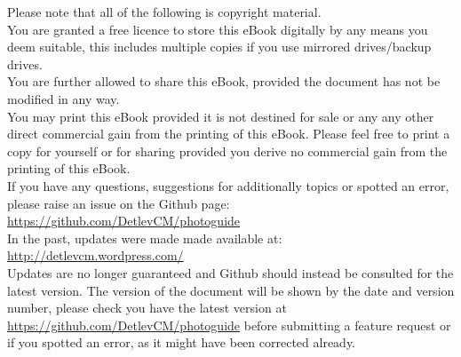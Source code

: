 \begin{center}
Please note that all of the following is copyright material.
\\
\vspace{10 mm}
You are granted a free licence to store this eBook digitally by any means you deem suitable, this includes multiple copies if you use mirrored drives/backup drives.
\\
You are further allowed to share this eBook, provided the document has not be modified in any way. 
\\
\vspace{5 mm}
You may print this eBook provided it is not destined for sale or any any other direct commercial gain from the printing of this eBook.
Please feel free to print a copy for yourself or for sharing provided you derive no commercial gain from the printing of this eBook.
\\
\vspace{20 mm}
If you have any questions, suggestions for additionally topics or spotted an error, please raise an issue on the Github page:
\\
\href{https://github.com/DetlevCM/photoguide}{https://github.com/DetlevCM/photoguide}
\\
In the past, updates were made made available at:
\\
\href{http://detlevcm.wordpress.com/}{http://detlevcm.wordpress.com/}
\\
Updates are no longer guaranteed and Github should instead be consulted for the latest version.
\vspace{20 mm}
The version of the document will be shown by the date and version number, please check you have the latest version at \href{https://github.com/DetlevCM/photoguide}{https://github.com/DetlevCM/photoguide} before submitting a feature request or if you spotted an error, as it might have been corrected already. 
\end{center}
